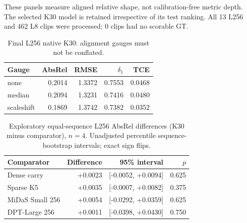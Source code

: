These panels measure aligned relative shape, not calibration-free metric depth. The selected K30 model is retained irrespective of its test ranking. All 13 L256 and 462 L8 clips were processed; 0 clips had no scorable GT.
\begin{table}[H]
\caption{Final L256 native K30: alignment gauges must not be conflated.}\label{tab:gauges}
\centering\small
\begin{tabular}{lrrrr}\toprule
Gauge & AbsRel & RMSE & $\delta_1$ & TCE \\
\midrule
none & 0.2014 & 1.3372 & 0.7553 & 0.0468 \\
median & 0.2094 & 1.3231 & 0.7416 & 0.0480 \\
scaleshift & 0.1869 & 1.3742 & 0.7382 & 0.0352 \\
\bottomrule\end{tabular}
\end{table}
\begin{table}[H]
\caption{Exploratory equal-sequence L256 AbsRel differences (K30 minus comparator), $n=4$. Unadjusted percentile sequence-bootstrap intervals; exact sign flips.}\label{tab:paired}
\centering\small
\begin{tabular}{lrrr}\toprule
Comparator & Difference & 95\% interval & $p$ \\
\midrule
Dense carry & +0.0023 & [-0.0052, +0.0094] & 0.625 \\
Sparse K5 & +0.0035 & [-0.0007, +0.0082] & 0.375 \\
MiDaS Small 256 & +0.0054 & [-0.0292, +0.0359] & 0.625 \\
DPT-Large 256 & +0.0011 & [-0.0398, +0.0430] & 0.750 \\
\bottomrule\end{tabular}
\end{table}
